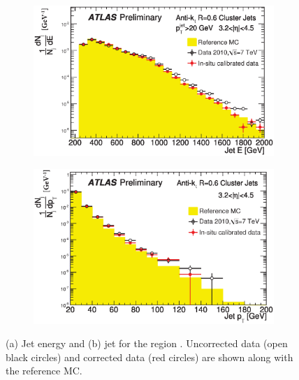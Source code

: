 \begin{figure}
\medskip
        \begin{subfigure}[b]{0.5\textwidth}
                \centering
                \includegraphics[width=\textwidth]{figures/JetPerformance/EDist-Edit.eps}
        \end{subfigure}%
        \begin{subfigure}[b]{0.5\textwidth}
                \centering
                \includegraphics[width=\textwidth]{figures/JetPerformance/PtDist-Edit.eps}
        \end{subfigure}%
\caption[Effect of additional calibration on the jet energy and \pt{} distributions for jets in the FCal]{
(a) Jet energy and (b) jet \pt{} for the region .
Uncorrected data (open black circles) and corrected data (red circles) are shown along with the reference MC. 
\label{JetPerf:E_PtData}}
\end{figure}
